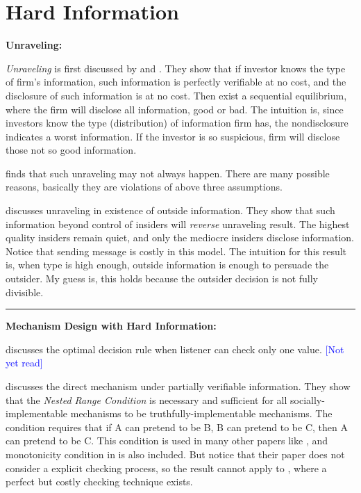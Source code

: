 \documentclass{book}
\theoremstyle{plain}
\theoremstyle{definition}
\newcommand{\myline}{\vspace{3mm} \hrule \vspace{4mm}}
\begin{document}


\section{Hard Information} %
\label{sec:hard_information}

\noindent
\textbf{Unraveling:}

\textit{Unraveling} is first discussed by \cite{Grossman:1981ih} and \cite{Milgrom:1981dv}. 
They show that if investor knows the type of firm's information, 
such information is perfectly verifiable at no cost, and the disclosure of such information is at no cost.
Then exist a sequential equilibrium, where the firm will disclose all information, good or bad.
The intuition is, since investors know the type (distribution) of information firm has, the nondisclosure indicates a worst information.
If the investor is so suspicious, firm will disclose those not so good information.

\cite{Dye:1985a} finds that such unraveling may not always happen.
There are many possible reasons, basically they are violations of above three assumptions.

\cite{Quigley:2017us} discusses unraveling in existence of outside information. They show that such information beyond control of insiders will \textit{reverse} unraveling result.
The highest quality insiders remain quiet, and only the mediocre insiders disclose information.
Notice that sending message is costly in this model.
The intuition for this result is,
when type is high enough,
outside information is enough to persuade the outsider.
My guess is,
this holds because the outsider decision is not fully divisible.

\myline
\noindent
\textbf{Mechanism Design with Hard Information:}

\cite{galzer_ruinstein:emca04} discusses the optimal decision rule when listener can check only one value.
\textcolor{blue}{[Not yet read]}

\cite{Green:1986gs} discusses the direct mechanism under partially verifiable information. 
They show that the \textit{Nested Range Condition} is necessary and sufficient for all socially-implementable mechanisms to be truthfully-implementable mechanisms.
The condition requires that if A can pretend to be B,
B can pretend to be C, then A can pretend to be C.
This condition is used in many other papers like \cite{Hart_et:17aer_evidence_games}, and monotonicity condition in \cite{Grossman:1981ih} is also included.
But notice that their paper does not consider a explicit checking process, so the result cannot apply to \cite{BenPorath:2014bc}, where a perfect but costly checking technique exists.
\end{document}
